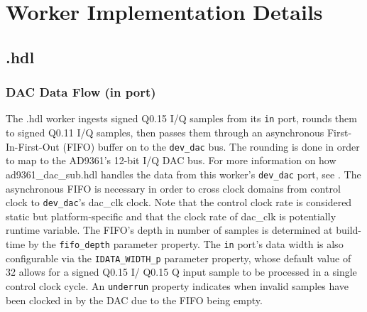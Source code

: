 \section*{Worker Implementation Details}
\subsection*{\comp.hdl}
\subsubsection*{DAC Data Flow (in port)}
The \comp{}.hdl worker ingests signed Q0.15 I/Q samples from its \verb+in+ port, rounds them to signed Q0.11 I/Q samples, then passes them through an asynchronous First-In-First-Out (FIFO) buffer on to the \verb+dev_dac+ \devsignal{} bus. The rounding is done in order to map to the AD9361's 12-bit I/Q DAC bus\cite{adi_ug570}. For more information on how ad9361\_dac\_sub.hdl handles the data from this worker's \verb+dev_dac+ port, see \cite{dac_sub_comp_datasheet}. The asynchronous FIFO is necessary in order to cross clock domains from control clock to \verb+dev_dac+'s dac\_clk clock. Note that the control clock rate is considered static but platform-specific and that the clock rate of dac\_clk is potentially runtime variable. The FIFO's depth in number of samples is determined at build-time by the \verb+fifo_depth+ parameter property. The \verb+in+ port's data width is also configurable via the \verb+IDATA_WIDTH_p+ parameter property, whose default value of 32 allows for a signed Q0.15 I/ Q0.15 Q input sample to be processed in a single control clock cycle. An \verb+underrun+ property indicates when invalid samples have been clocked in by the DAC due to the FIFO being empty.
